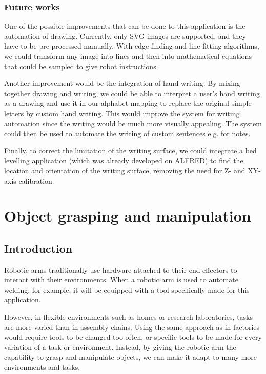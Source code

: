 \subsubsection{Future works}

One of the possible improvements that can be done to this application is the automation of drawing. Currently, only SVG images are supported, and they have to be pre-processed manually. With edge finding and line fitting algorithms, we could transform any image into lines and then into mathematical equations that could be sampled to give robot instructions.

Another improvement would be the integration of hand writing. By mixing together drawing and writing, we could be able to interpret a user's hand writing as a drawing and use it in our alphabet mapping to replace the original simple letters by custom hand writing. This would improve the system for writing automation since the writing would be much more visually appealing. The system could then be used to automate the writing of custom sentences e.g. for notes.

Finally, to correct the limitation of the writing surface, we could integrate a bed levelling application (which was already developed on ALFRED) to find the location and orientation of the writing surface, removing the need for Z- and XY-axis calibration.



\section{Object grasping and manipulation}


\subsection{Introduction}

Robotic arms traditionally use hardware attached to their end effectors to interact with their environments. When a robotic arm is used to automate welding, for example, it will be equipped with a tool specifically made for this application.

However, in flexible environments such as homes or research laboratories, tasks are more varied than in assembly chains. Using the same approach as in factories would require tools to be changed too often, or specific tools to be made for every variation of a task or environment. Instead, by giving the robotic arm the capability to grasp and manipulate objects, we can make it adapt to many more environments and tasks.


